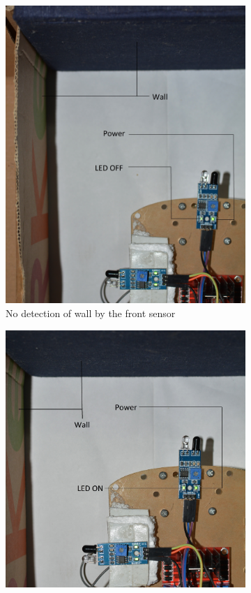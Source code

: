 \begin{figure}[h]
\begin{center}
        \begin{subfigure}[b]{0.5\textwidth}
                 \includegraphics[scale=0.195]{part3_3_lb.jpg} 
                \caption{No detection of wall by the front sensor}
        \end{subfigure}
        \begin{subfigure}[b]{0.5\textwidth}
                  \includegraphics[scale=0.195]{part3_4_lb.jpg} 

\end{subfigure}
\end{center}
\end{figure}
